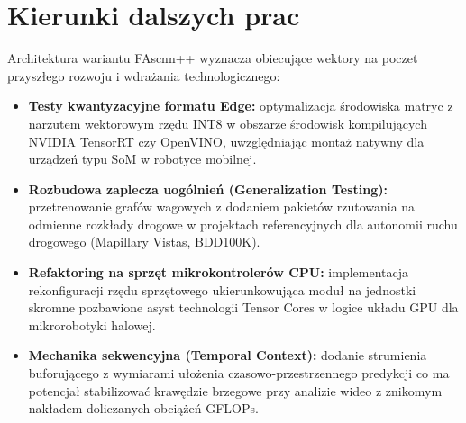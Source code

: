 \section{Kierunki dalszych prac}
Architektura wariantu FAscnn++ wyznacza obiecujące wektory na poczet przyszłego rozwoju i wdrażania technologicznego:
\begin{itemize}
    \item \textbf{Testy kwantyzacyjne formatu Edge:} optymalizacja środowiska matryc z narzutem wektorowym rzędu INT8 w obszarze środowisk kompilujących NVIDIA TensorRT czy OpenVINO, uwzględniając montaż natywny dla urządzeń typu SoM w robotyce mobilnej.
    \item \textbf{Rozbudowa zaplecza uogólnień (Generalization Testing):} przetrenowanie grafów wagowych z dodaniem pakietów rzutowania na odmienne rozkłady drogowe w projektach referencyjnych dla autonomii ruchu drogowego (Mapillary Vistas, BDD100K).
    \item \textbf{Refaktoring na sprzęt mikrokontrolerów CPU:} implementacja rekonfiguracji rzędu sprzętowego ukierunkowująca moduł na jednostki skromne pozbawione asyst technologii Tensor Cores w logice układu GPU dla mikrorobotyki halowej.
    \item \textbf{Mechanika sekwencyjna (Temporal Context):} dodanie strumienia buforującego z wymiarami ułożenia czasowo-przestrzennego predykcji co ma potencjał stabilizować krawędzie brzegowe przy analizie wideo z znikomym nakładem doliczanych obciążeń GFLOPs.
\end{itemize}